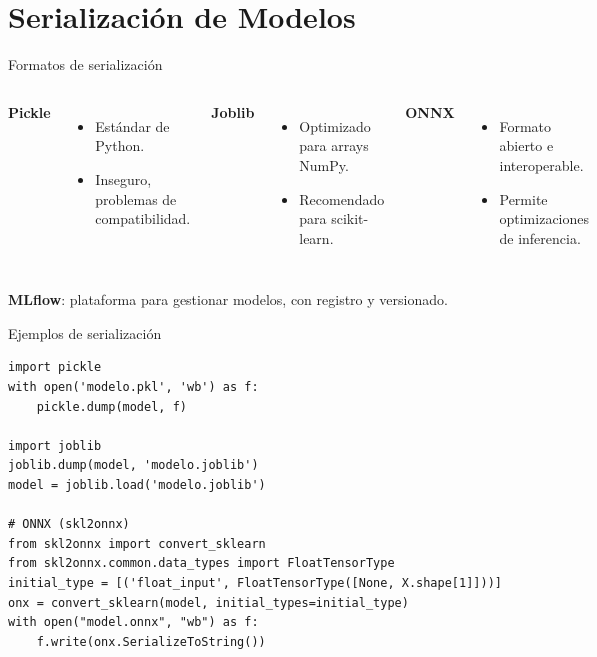\documentclass[aspectratio=169, 10pt, xcolor=table]{beamer}
\begin{document}
\section{Serialización de Modelos}

\begin{frame}{Formatos de serialización}
    \begin{columns}[t]
        \textbf{Pickle}
        \begin{itemize}
            \item Estándar de Python.
            \item Inseguro, problemas de compatibilidad.
        \end{itemize}
        \textbf{Joblib}
        \begin{itemize}
            \item Optimizado para arrays NumPy.
            \item Recomendado para scikit-learn.
        \end{itemize}
        \textbf{ONNX}
        \begin{itemize}
            \item Formato abierto e interoperable.
            \item Permite optimizaciones de inferencia.
        \end{itemize}
    \end{columns}
    \vspace{0.3cm}
    \textbf{MLflow}: plataforma para gestionar modelos, con registro y versionado.
\end{frame}

\begin{frame}[fragile]{Ejemplos de serialización}
    \begin{lstlisting}
import pickle
with open('modelo.pkl', 'wb') as f:
    pickle.dump(model, f)

import joblib
joblib.dump(model, 'modelo.joblib')
model = joblib.load('modelo.joblib')

# ONNX (skl2onnx)
from skl2onnx import convert_sklearn
from skl2onnx.common.data_types import FloatTensorType
initial_type = [('float_input', FloatTensorType([None, X.shape[1]]))]
onx = convert_sklearn(model, initial_types=initial_type)
with open("model.onnx", "wb") as f:
    f.write(onx.SerializeToString())
    \end{lstlisting}
\end{frame}
\end{document}
